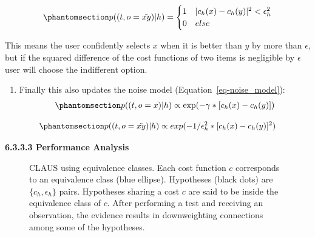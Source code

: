 \documentclass[
  letterpaper,
  numbers=noenddot,
  DIV=11]{scrreprt}
\providecommand{\tightlist}{%
  \setlength{\itemsep}{0pt}\setlength{\parskip}{0pt}}\usepackage{longtable,booktabs,array}
\theoremstyle{definition}
\theoremstyle{plain}
\theoremstyle{plain}
\theoremstyle{remark}
\begin{document}
\begin{equation}\phantomsection\label{eq-eq3.32}{\begin{aligned}
    p((t, o = \tilde{xy}) | h) = 
    \begin{cases}
        1 & |c_h(x) - c_h(y)|^2 < \epsilon_h^2\\
        0 & else
    \end{cases}
\end{aligned}}\end{equation}

This means the user confidently selects \(x\) when it is better than
\(y\) by more than \(\epsilon\), but if the squared difference of the
cost functions of two items is negligible by \(\epsilon\) user will
choose the indifferent option.

\begin{enumerate}
\def\labelenumi{\arabic{enumi}.}
\setcounter{enumi}{2}
\tightlist
\item
  Finally this also updates the noise model
  (Equation~\ref{eq-noise_model}):
  \begin{equation}\phantomsection\label{eq-eq3.33}{\begin{aligned}
  p((t, o = x) | h) \propto \exp(-\gamma * [c_h(x) - c_h(y)])
  \end{aligned}}\end{equation}
\end{enumerate}

\begin{equation}\phantomsection\label{eq-eq3.34}{\begin{aligned}
    p((t, o = \tilde{xy}) | h) \propto exp(-1/\epsilon_h^2 * [c_h(x) - c_h(y)]^2)
\end{aligned}}\end{equation}

\textbf{6.3.3.3 Performance Analysis}

\begin{figure}


\caption{\label{fig-equiv_c}CLAUS using equivalence classes. Each cost
function \(c\) corresponds to an equivalence class (blue ellipse).
Hypotheses (black dots) are \(\{c_h,\epsilon_h\}\) pairs. Hypotheses
sharing a cost \(c\) are said to be inside the equivalence class of
\(c\). After performing a test and receiving an observation, the
evidence results in downweighting connections among some of the
hypotheses.}

\end{figure}%
\end{document}
